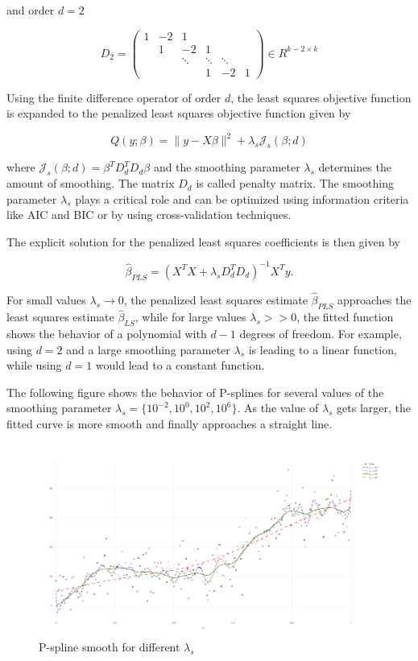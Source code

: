 \documentclass[10pt,a4paper]{article}
\begin{document}
	and order $d=2$
	
	$$D_2 = \begin{pmatrix} 
				1& -2& 1& &    \\  
				 & 1 & -2 & 1& \\ 
				 &  & \ddots & \ddots  & \ddots \\ 
				 & & & 1 & -2 & 1 
			\end{pmatrix} \in R^{k-2\times k}$$
	
	Using the finite difference operator of order $d$, the least squares objective function is expanded to the penalized least squares objective function given by
	
	$$Q(y; \beta) = \lVert y - X\beta \rVert^2 + \lambda_s \mathcal J_s(\beta; d)$$
	
	where $\mathcal J_s(\beta; d) = \beta^T D_d^T D_d \beta$ and the smoothing parameter $\lambda_s$ determines the amount of smoothing. The matrix $D_d$ is called penalty matrix. The smoothing parameter $\lambda_s$ plays a critical role and can be optimized using information criteria like AIC and BIC or by using cross-validation techniques. 
	
	The explicit solution for the penalized least squares coefficients is then given by
	
	$$\hat \beta_{PLS} = (X^TX + \lambda_s D_d^TD_d)^{-1} X^T y.$$
	
	For small values $\lambda_s \rightarrow 0$, the penalized least squares estimate $\hat \beta_{PLS}$ approaches the least squares estimate $\hat \beta_{LS}$, while for large values $\lambda_s >> 0$, the fitted function shows the behavior of a polynomial with $d-1$ degrees of freedom. For example, using $d=2$ and a large smoothing parameter $\lambda_s$ is leading to a linear function, while using $d=1$ would lead to a constant function.
	
	The following figure shows the behavior of P-splines for several values of the smoothing parameter $\lambda_s = \{10^{-2}, 10^{0},10^{2},10^{6}\}.$  As the value of $\lambda_s$ gets larger, the fitted curve is more smooth and finally approaches a straight line.
	
	
	
	\begin{figure}[H]
		\centering
		\includegraphics[width=\linewidth]{thesisplots/p_splines.pdf}
		\caption{P-spline smooth for different $\lambda_s$}
		\label{fig:pspline}
	\end{figure}
			
\end{document}
